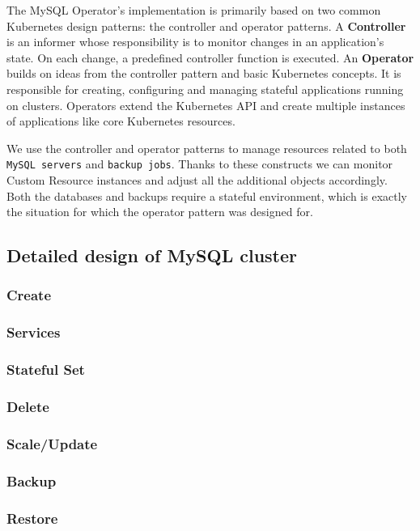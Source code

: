 The MySQL Operator’s implementation is primarily based on two common Kubernetes design
patterns: the controller and operator patterns. A \textbf{Controller} is an informer whose
responsibility is to monitor changes in an application’s state. On each change, a predefined
controller function is executed. An \textbf{Operator} builds on ideas from the controller
pattern and basic Kubernetes concepts. It is responsible for creating, configuring and
managing stateful applications running on clusters. Operators extend the Kubernetes API and
create multiple instances of applications like core Kubernetes resources.

We use the controller and operator patterns to manage resources related to both
\texttt{MySQL servers} and \texttt{backup jobs}. Thanks to these constructs we can monitor
Custom Resource instances and adjust all the additional objects accordingly. Both the
databases and backups require a stateful environment, which is exactly the situation for
which the operator pattern was designed for.~\cite{coreos}

\subsection{Detailed design of MySQL cluster}
\subsubsection{Create}
\subsubsection{Services}
\subsubsection{Stateful Set}
\subsubsection{Delete}
\subsubsection{Scale/Update}
\subsubsection{Backup}
\subsubsection{Restore}


